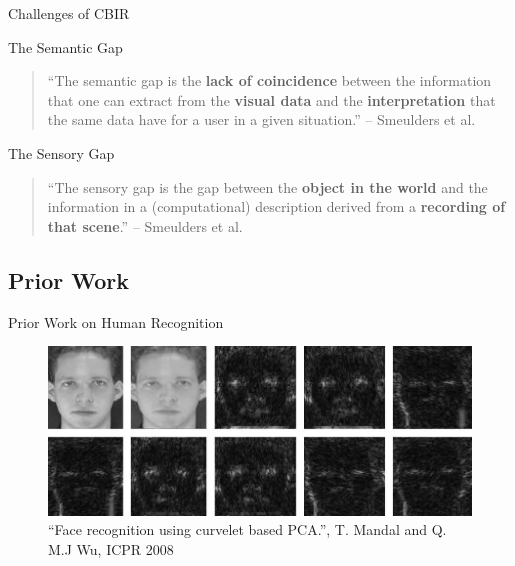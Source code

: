 \documentclass[mathserif]{beamer}
\begin{document}
\begin{frame}{Challenges of CBIR}
    \begin{block}{The Semantic Gap}
        \begin{quote}
            ``The semantic gap is the \textbf{lack of coincidence} between the
            information that one can extract from the \textbf{visual data} and
            the \textbf{interpretation} that the same data have for a user in a
            given situation.'' -- Smeulders et al.
        \end{quote}
    \end{block}
    \begin{block}{The Sensory Gap}
        \begin{quote}
            ``The sensory gap is the gap between the \textbf{object in the
            world} and the information in a (computational) description derived
            from a \textbf{recording of that scene}.'' -- Smeulders et al.
        \end{quote}
    \end{block}
\end{frame}

\subsection{Prior Work}
\begin{frame}{Prior Work on Human Recognition}
    \begin{figure}
        \includegraphics[width=.9\textwidth]{illustrations/related_work/curvelet_faces_mandal09}
        \caption{``Face recognition using curvelet based PCA.'', T. Mandal and Q. M.J Wu, ICPR 2008}
    \end{figure}
\end{frame}
\end{document}
